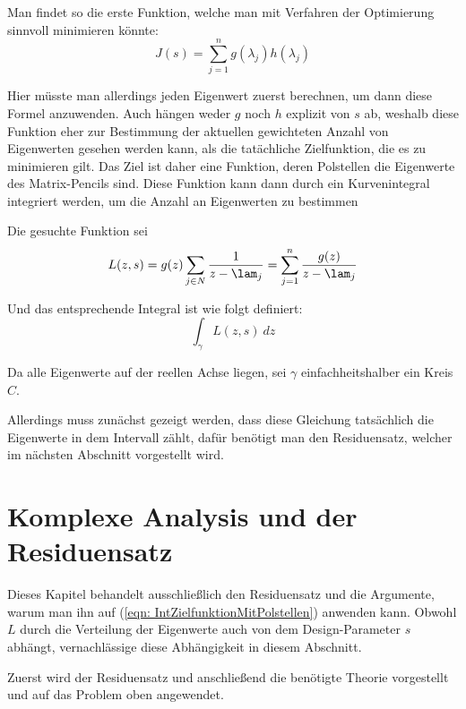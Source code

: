 \documentclass[a4paper,12pt]{report}
\newcommand{\1}{\mathds{1}}
\theoremstyle{plain} %
\theoremstyle{definition} %
\theoremstyle{remark}
\begin{document}
            Man findet so die erste Funktion, welche man mit Verfahren der Optimierung sinnvoll minimieren könnte:
            $$J(s) = \sum_{j=1}^n g(\lambda_j)h(\lambda_j)$$

            Hier müsste man allerdings jeden Eigenwert zuerst berechnen, um dann diese Formel anzuwenden.
            Auch hängen weder $g$ noch $h$ explizit von $s$ ab, weshalb diese Funktion eher zur Bestimmung der aktuellen gewichteten Anzahl von Eigenwerten gesehen werden kann, als die tatächliche Zielfunktion, die es zu minimieren gilt.
            Das Ziel ist daher eine Funktion, deren Polstellen die Eigenwerte des Matrix-Pencils sind.
            Diese Funktion kann dann durch ein Kurvenintegral integriert werden, um die Anzahl an Eigenwerten zu bestimmen

            Die gesuchte Funktion sei
            \begin{equation}
                  \label{eqn: ZielfunktionMitPolstellen}
                  L(z, s) = g(z)\sum_{j\in N} \frac{1}{z-\lam_j} = \sum_{j=1}^n \frac{g(z)}{z-\lam_j}
            \end{equation}

            Und das entsprechende Integral ist wie folgt definiert:
            \begin{equation}
                  \label{eqn: IntZielfunktionMitPolstellen}
                 \int_\gamma L(z, s)\ dz
            \end{equation}

            Da alle Eigenwerte auf der reellen Achse liegen, sei $\gamma$ einfachheitshalber ein Kreis $C$.

            Allerdings muss zunächst gezeigt werden, dass diese Gleichung tatsächlich die Eigenwerte in dem Intervall zählt, dafür benötigt man den Residuensatz, welcher im nächsten Abschnitt vorgestellt wird.
      \section{Komplexe Analysis und der Residuensatz}
            Dieses Kapitel behandelt ausschließlich den Residuensatz und die Argumente, warum man ihn auf (\ref{eqn: IntZielfunktionMitPolstellen}) anwenden kann.
            Obwohl $L$ durch die Verteilung der Eigenwerte auch von dem Design-Parameter $s$ abhängt, vernachlässige diese Abhängigkeit in diesem Abschnitt.

            Zuerst wird der Residuensatz und anschließend die benötigte Theorie vorgestellt und auf das Problem oben angewendet.
\end{document}
